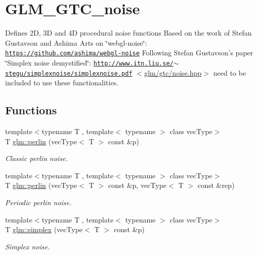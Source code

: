 \hypertarget{group__gtc__noise}{\section{G\-L\-M\-\_\-\-G\-T\-C\-\_\-noise}
\label{group__gtc__noise}
}


Defines 2\-D, 3\-D and 4\-D procedural noise functions Based on the work of Stefan Gustavson and Ashima Arts on \char`\"{}webgl-\/noise\char`\"{}\-: \href{https://github.com/ashima/webgl-noise}{\tt https\-://github.\-com/ashima/webgl-\/noise} Following Stefan Gustavson's paper \char`\"{}\-Simplex noise demystified\char`\"{}\-: \href{http://www.itn.liu.se/~stegu/simplexnoise/simplexnoise.pdf}{\tt http\-://www.\-itn.\-liu.\-se/$\sim$stegu/simplexnoise/simplexnoise.\-pdf} $<$\hyperlink{noise_8hpp}{glm/gtc/noise.\-hpp}$>$ need to be included to use these functionalities.  


\subsection*{Functions}
\begin{DoxyCompactItemize}
\item 
{\footnotesize template$<$typename T , template$<$ typename $>$ class vec\-Type$>$ }\\T \hyperlink{group__gtc__noise_gaa9f3e905afe771551512322edcec001b}{glm\-::perlin} (vec\-Type$<$ T $>$ const \&p)
\begin{DoxyCompactList}\small\item\em Classic perlin noise. \end{DoxyCompactList}\item 
{\footnotesize template$<$typename T , template$<$ typename $>$ class vec\-Type$>$ }\\T \hyperlink{group__gtc__noise_ga52495e641513a2f965178d2a5d803077}{glm\-::perlin} (vec\-Type$<$ T $>$ const \&p, vec\-Type$<$ T $>$ const \&rep)
\begin{DoxyCompactList}\small\item\em Periodic perlin noise. \end{DoxyCompactList}\item 
{\footnotesize template$<$typename T , template$<$ typename $>$ class vec\-Type$>$ }\\T \hyperlink{group__gtc__noise_ga5fa44c45d9b0cf67559b705c95b5dcd7}{glm\-::simplex} (vec\-Type$<$ T $>$ const \&p)
\begin{DoxyCompactList}\small\item\em Simplex noise. \end{DoxyCompactList}\end{DoxyCompactItemize}


